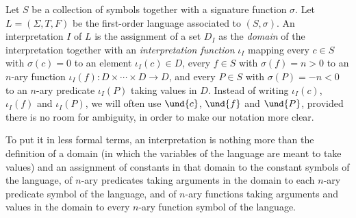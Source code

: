 \begin{definition}
Let $S$ be a collection of symbols together with a signature function $\sigma$.
Let $L = (\Sigma, T, F)$ be the first-order language associated to $(S,\sigma)$.
An interpretation $I$ of $L$ is the assignment of a set $D_I$ as the \emph{domain} of the interpretation together with an \emph{interpretation function} $\iota_I$ mapping every $c\in S$ with $\sigma(c) = 0$ to an element $\iota_I(c) \in D$, every $f\in S$ with $\sigma(f) = n > 0$ to an $n$-ary function $\iota_I(f):D\times\cdots\times D \longrightarrow D$, and every $P \in S $ with $\sigma(P) = -n < 0$ to an $n$-ary predicate $\iota_I(P)$ taking values in $D$.
Instead of writing $\iota_I(c)$, $\iota_I(f)$ and $\iota_I(P)$, we will often use $\und{c}$, $\und{f}$ and $\und{P}$, provided there is no room for ambiguity, in order to make our notation more clear.

To put it in less formal terms, an interpretation is nothing more than the definition of a domain (in which the variables of the language are meant to take values) and an assignment of constants in that domain to the constant symbols of the language, of $n$-ary predicates taking arguments in the domain to each $n$-ary predicate symbol of the language, and of $n$-ary functions taking arguments and values in the domain to every $n$-ary function symbol of the language.


\end{definition}
